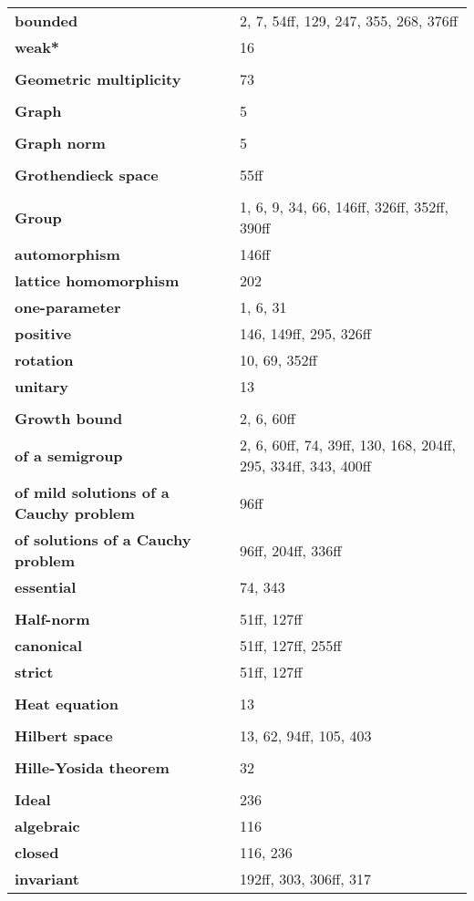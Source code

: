 \documentclass[10pt]{scrartcl}
\begin{document}
\begin{longtable}{>{\bfseries}p{6cm}p{8cm}}
\quad bounded & 2, 7, 54ff, 129, 247, 355, 268, 376ff \\
\quad weak* & 16 \\
\\
\textbf{Geometric multiplicity} & 73 \\
\\
\textbf{Graph} & 5 \\
\\
\textbf{Graph norm} & 5 \\
\\
\textbf{Grothendieck space} & 55ff \\
\\
\textbf{Group} & 1, 6, 9, 34, 66, 146ff, 326ff, 352ff, 390ff \\
\quad automorphism & 146ff \\
\quad lattice homomorphism & 202 \\
\quad one-parameter & 1, 6, 31 \\
\quad positive & 146, 149ff, 295, 326ff \\
\quad rotation & 10, 69, 352ff \\
\quad unitary & 13 \\
\\
\textbf{Growth bound} & 2, 6, 60ff \\
\quad of a semigroup & 2, 6, 60ff, 74, 39ff, 130, 168, 204ff, 295, 334ff, 343, 400ff \\
\quad of mild solutions of a Cauchy problem & 96ff \\
\quad of solutions of a Cauchy problem & 96ff, 204ff, 336ff \\
\quad essential & 74, 343 \\
\\
\textbf{Half-norm} & 51ff, 127ff \\
\quad canonical & 51ff, 127ff, 255ff \\
\quad strict & 51ff, 127ff \\
\\
\textbf{Heat equation} & 13 \\
\\
\textbf{Hilbert space} & 13, 62, 94ff, 105, 403 \\
\\
\textbf{Hille-Yosida theorem} & 32 \\
\\
\textbf{Ideal} & 236 \\
\quad algebraic & 116 \\
\quad closed & 116, 236 \\
\quad invariant & 192ff, 303, 306ff, 317 \\

\end{longtable}
\end{document}
